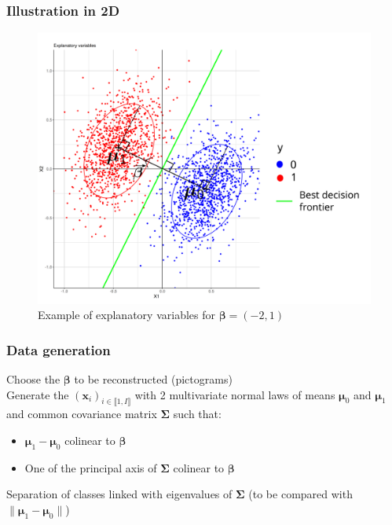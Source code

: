 \documentclass{beamer}
\begin{document}
\begin{frame}
    \frametitle{Illustration in 2D}

    \begin{figure}
        \centering
        \includegraphics[scale = 0.2]{images/2D_better.png}
        \caption{Example of explanatory variables for $\bm{\beta} = (-2,1)$}
    \end{figure}
\end{frame}

\begin{frame}
    \frametitle{Data generation}
    Choose the $\bm{\beta}$ to be reconstructed (pictograms)\\[10 pt]
    Generate the $(\mathbf{x}_i)_{i \in \llbracket 1, I\rrbracket}$ with 2 multivariate normal laws of means $\bm{\mu}_0$ and $\bm{\mu}_1$ and common covariance matrix $\bm{\Sigma}$ such that:
    \begin{itemize}
        \item $\bm{\mu}_1 - \bm{\mu}_0$ colinear to $\bm{\beta}$\\[10 pt]
        \item One of the principal axis of $\bm{\Sigma}$ colinear to $\bm{\beta}$
    \end{itemize}
    Separation of classes linked with eigenvalues of $\bm{\Sigma}$ (to be compared with $\lVert\bm{\mu}_1 - \bm{\mu}_0 \rVert$)
\end{frame}
\end{document}
